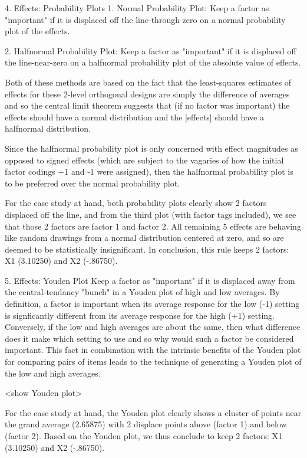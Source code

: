 4. Effects: Probability Plots
   1. Normal Probability Plot: Keep a factor as "important"
      if it is displaced off the line-through-zero
      on a normal probability plot of the
      effects.

   2. Halfnormal Probability Plot: Keep a factor as "important"
      if it is displaced off the
      line-near-zero on a halfnormal probability
      plot of the absolute value of effects.

   Both of these methods are based on the fact
   that the least-squares estimates of effects for
   these 2-level orthogonal designs are simply the
   difference of averages and so the central limit
   theorem suggests that (if no factor was
   important) the effects should have a normal
   distribution and the |effects| should have a
   halfnormal distribution.

   Since the halfnormal probability plot is only
   concerned with effect magnitudes as opposed to
   signed effects (which are subject to the
   vagaries of how the initial factor codings +1
   and -1 were assigned), then the halfnormal
   probability plot is to be preferred over the
   normal probability plot.

   For the case study at hand, both probability
   plots clearly show 2 factors displaced off the
   line, and from the third plot (with factor tags
   included), we see that those 2 factors are
   factor 1 and factor 2. All remaining 5 effects
   are behaving like random drawings from a normal
   distribution centered at zero, and so are
   deemed to be statistically insignificant.  In
   conclusion, this rule keeps 2 factors: X1
   (3.10250) and X2 (-.86750).

5. Effects: Youden Plot
   Keep a factor as "important" if it is displaced
   away from the central-tendancy "bunch" in a
   Youden plot of high and low averages.  By
   definition, a factor is important when its
   average response for the low (-1) setting is
   signficantly different from its average
   response for the high (+1) setting.
   Conversely, if the low and high averages are
   about the same, then what difference does it
   make which setting to use and so why would such
   a factor be considered important.  This fact in
   combination with the intrinsic benefits of the
   Youden plot for comparing pairs of items leads
   to the technique of generating a Youden plot of
   the low and high averages.

   <show Youden plot>

   For the case study at hand, the Youden plot
   clearly shows a cluster of points near the
   grand average (2.65875) with 2 displace points
   above (factor 1) and below (factor 2).  Based
   on the Youden plot, we thus conclude to keep 2
   factors: X1 (3.10250) and X2 (-.86750).

